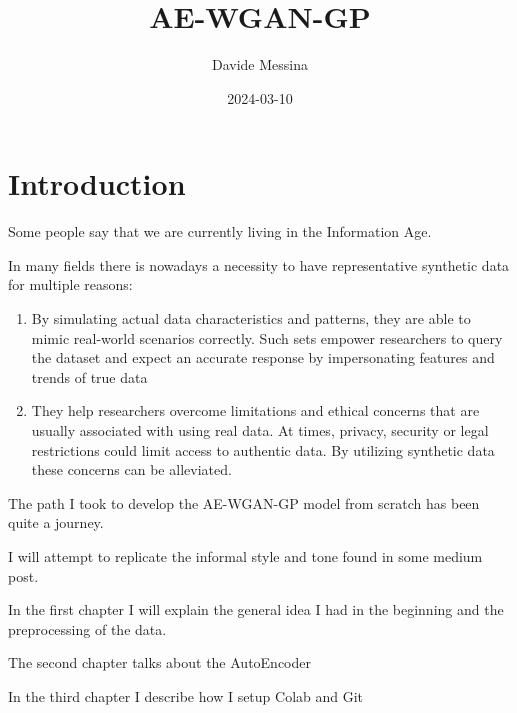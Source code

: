 \documentclass[
  letterpaper,
  DIV=11,
  numbers=noendperiod]{scrreprt}
\title{AE-WGAN-GP}
\author{Davide Messina}
\date{2024-03-10}
\renewcommand*\contentsname{Table of contents}
\newcommand\contentsname{Table of contents}
\begin{document}
\maketitle
\ifdefined\Shaded\renewenvironment{Shaded}{\begin{tcolorbox}[borderline west={3pt}{0pt}{shadecolor}, sharp corners, enhanced, boxrule=0pt, interior hidden, frame hidden, breakable]}{\end{tcolorbox}}\fi

\renewcommand*\contentsname{Table of contents}
{
\hypersetup{linkcolor=}
\setcounter{tocdepth}{2}
\tableofcontents
}

\hypertarget{introduction}{%
\chapter{Introduction}\label{introduction}}

Some people say that we are currently living in the Information Age.

In many fields there is nowadays a necessity to have representative
synthetic data for multiple reasons:

\begin{enumerate}
\def\labelenumi{\arabic{enumi})}
\item
  By simulating actual data characteristics and patterns, they are able
  to mimic real-world scenarios correctly. Such sets empower researchers
  to query the dataset and expect an accurate response by impersonating
  features and trends of true data
\item
  They help researchers overcome limitations and ethical concerns that
  are usually associated with using real data. At times, privacy,
  security or legal restrictions could limit access to authentic data.
  By utilizing synthetic data these concerns can be alleviated.
\end{enumerate}

The path I took to develop the AE-WGAN-GP model from scratch has been
quite a journey.

I will attempt to replicate the informal style and tone found in some
medium post.

In the first chapter I will explain the general idea I had in the
beginning and the preprocessing of the data.

The second chapter talks about the AutoEncoder

In the third chapter I describe how I setup Colab and Git
\end{document}
